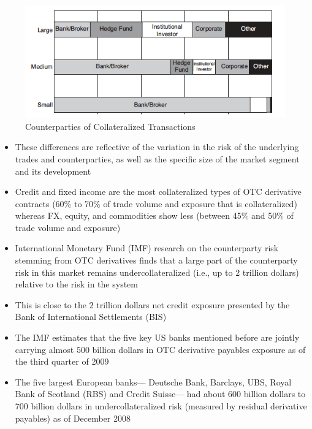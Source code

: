 \documentclass[11pt]{beamer}
\begin{document}
\begin{frame}
\begin{figure}
\includegraphics[width=\textwidth]{13_3.png}
\caption{Counterparties of Collateralized Transactions}
\end{figure}
\end{frame}

\begin{frame}
\begin{itemize}
\item These differences are reflective of the variation in the risk of the underlying trades and counterparties, as well as the specific size of the market segment and its development
\item Credit and fixed income are the most collateralized types of OTC derivative contracts (60\% to 70\% of trade volume and exposure that is collateralized) whereas FX, equity, and commodities show less (between 45\% and 50\% of trade volume and exposure)
\item International Monetary Fund (IMF) research on the counterparty risk stemming from OTC derivatives finds that a large part of the counterparty risk in this market remains undercollateralized (i.e., up to $2$ trillion dollars) relative to the risk in the system
\end{itemize}
\end{frame}

\begin{frame}
\begin{itemize}
\item This is close to the $2$ trillion dollars net credit exposure presented by the Bank of International Settlements (BIS)
\item The IMF estimates that the five key US banks mentioned before are jointly carrying almost $500$ billion dollars in OTC derivative payables exposure as of the third quarter of 2009
\item The five largest European banks— Deutsche Bank, Barclays, UBS, Royal Bank of Scotland (RBS) and Credit Suisse— had about $600$ billion dollars to $700$ billion dollars in undercollateralized risk (measured by residual derivative payables) as of December 2008
\end{itemize}
\end{frame}
\end{document}
